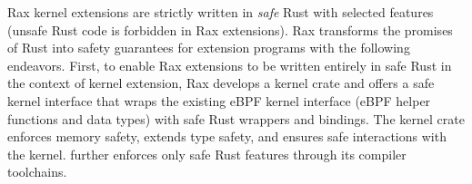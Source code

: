 


Rax kernel extensions are strictly written in {\it safe} Rust with selected
    features (unsafe Rust
    code is forbidden in Rax extensions).
Rax transforms the promises of Rust into safety guarantees for
    extension programs with the following endeavors.
First, to enable Rax extensions to be written entirely in safe Rust
    in the context of kernel extension,
    Rax develops a kernel crate and offers a safe kernel interface that
    wraps the existing eBPF kernel interface (eBPF
    helper functions and data types) with safe Rust wrappers and bindings.
The kernel crate enforces memory safety, extends type safety,
    and ensures safe interactions with the kernel.
\projname{} further enforces only safe Rust features through its compiler toolchains.

